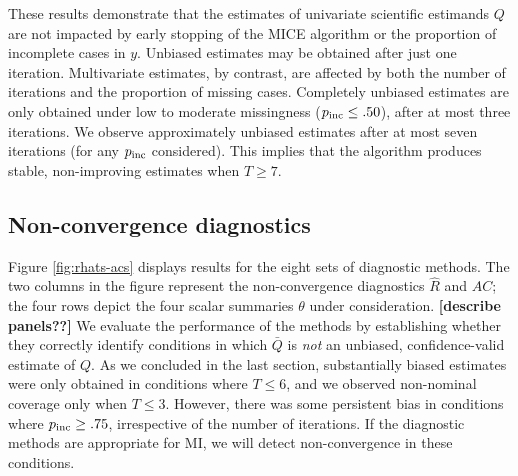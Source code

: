 \documentclass[Royal,times,sageh]{sagej}
\begin{document}
\noindent These results demonstrate that the estimates of univariate scientific estimands \(Q\) are not impacted by early stopping of the MICE algorithm or the proportion of incomplete cases in \(y\). Unbiased estimates may be obtained after just one iteration. Multivariate estimates, by contrast, are affected by both the number of iterations and the proportion of missing cases. Completely unbiased estimates are only obtained under low to moderate missingness (\(p_{\rm inc}\leq.50\)), after at most three iterations. We observe approximately unbiased estimates after at most seven iterations (for any \(p_{\rm inc}\) considered). This implies that the algorithm produces stable, non-improving estimates when \(T\geq7\).

\hypertarget{non-convergence-diagnostics-1}{%
\subsection{Non-convergence diagnostics}\label{non-convergence-diagnostics-1}}

Figure \ref{fig:rhats-acs} displays results for the eight sets of diagnostic methods. The two columns in the figure represent the non-convergence diagnostics \(\widehat{R}\) and \(AC\); the four rows depict the four scalar summaries \(\theta\) under consideration. \textbf{{[}describe panels??{]}} We evaluate the performance of the methods by establishing whether they correctly identify conditions in which \(\bar{Q}\) is \emph{not} an unbiased, confidence-valid estimate of \(Q\). As we concluded in the last section, substantially biased estimates were only obtained in conditions where \(T\leq6\), and we observed non-nominal coverage only when \(T\leq3\). However, there was some persistent bias in conditions where \(p_{\rm inc}\geq.75\), irrespective of the number of iterations. If the diagnostic methods are appropriate for MI, we will detect non-convergence in these conditions.
\end{document}
